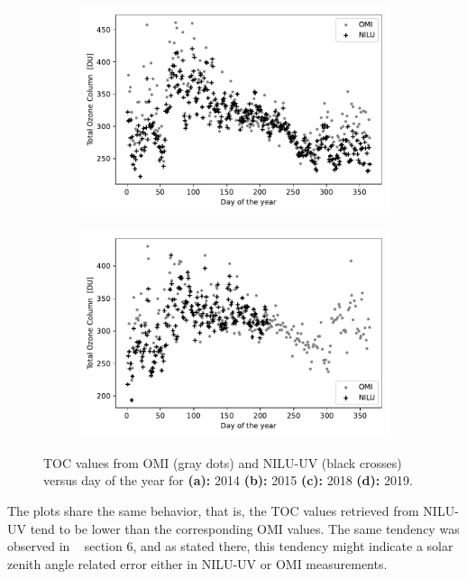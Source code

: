 \documentclass{optica-article}
\begin{document}
\begin{figure}
\begin{subfigure}[b]{0.45\textwidth}
	\includegraphics[width=\textwidth]{OMI_L3_NILU_O3_2018}
	\caption{}
	\label{fig:omil3niluo32018}
\end{subfigure}
\hfill
\begin{subfigure}[b]{0.45\textwidth}
	\includegraphics[width=\textwidth]{OMI_L3_NILU_O3_2019}
	\caption{}
	\label{fig:omil3niluo32019}
\end{subfigure}

\caption{TOC values from OMI (gray dots) and NILU-UV (black crosses) versus day of the year for \textbf{(a):} 2014 \textbf{(b):} 2015 \textbf{(c):} 2018 \textbf{(d):} 2019.}
\end{figure}



The plots share the same behavior, that is, the TOC values retrieved from NILU-UV tend to be lower than the corresponding OMI values. 
The same tendency was observed in ~\cite{Sztipanov:20} section 6, and as stated there, this tendency might indicate a solar zenith angle related error either in NILU-UV or OMI measurements.
\end{document}
